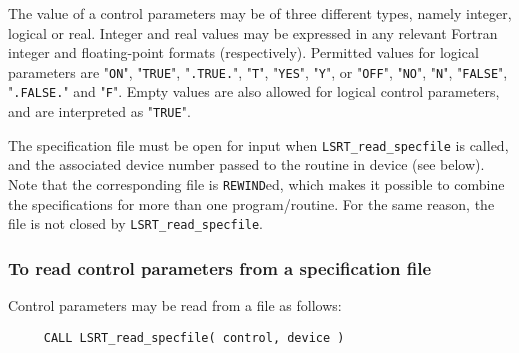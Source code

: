 \documentclass{galahad}
\newcommand{\packagename}{LS\-RT}
\begin{document}
The value of a control parameters may be of three different types, namely
integer, logical or real.
Integer and real values may be expressed in any relevant Fortran integer and
floating-point formats (respectively). Permitted values for logical
parameters are "{\tt ON}", "{\tt TRUE}", "{\tt .TRUE.}", "{\tt T}",
"{\tt YES}", "{\tt Y}", or "{\tt OFF}", "{\tt NO}",
"{\tt N}", "{\tt FALSE}", "{\tt .FALSE.}" and "{\tt F}".
Empty values are also allowed for
logical control parameters, and are interpreted as "{\tt TRUE}".

The specification file must be open for
input when {\tt \packagename\_read\_specfile}
is called, and the associated device number
passed to the routine in device (see below).
Note that the corresponding
file is {\tt REWIND}ed, which makes it possible to combine the specifications
for more than one program/routine.  For the same reason, the file is not
closed by {\tt \packagename\_read\_specfile}.

\subsubsection{To read control parameters from a specification file}
\label{readspec}

Control parameters may be read from a file as follows:
\hskip0.5in
\def\baselinestretch{0.8} {\tt \begin{verbatim}
     CALL LSRT_read_specfile( control, device )
\end{verbatim}}
\def\baselinestretch{1.0}
\end{document}

